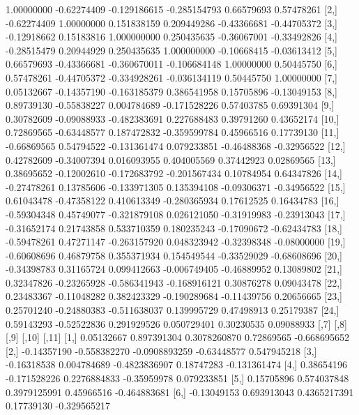\documentclass[a4paper, 12pt]{article}
\begin{document}
\begin{table}[H]
\small
\begin{Schunk}
\begin{Soutput}
             [,1]        [,2]         [,3]         [,4]        [,5]        [,6]
 [1,]  1.00000000 -0.62274409 -0.129186615 -0.285154793  0.66579693  0.57478261
 [2,] -0.62274409  1.00000000  0.151838159  0.209449286 -0.43366681 -0.44705372
 [3,] -0.12918662  0.15183816  1.000000000  0.250435635 -0.36067001 -0.33492826
 [4,] -0.28515479  0.20944929  0.250435635  1.000000000 -0.10668415 -0.03613412
 [5,]  0.66579693 -0.43366681 -0.360670011 -0.106684148  1.00000000  0.50445750
 [6,]  0.57478261 -0.44705372 -0.334928261 -0.036134119  0.50445750  1.00000000
 [7,]  0.05132667 -0.14357190 -0.163185379  0.386541958  0.15705896 -0.13049153
 [8,]  0.89739130 -0.55838227  0.004784689 -0.171528226  0.57403785  0.69391304
 [9,]  0.30782609 -0.09088933 -0.482383691  0.227688483  0.39791260  0.43652174
[10,]  0.72869565 -0.63448577  0.187472832 -0.359599784  0.45966516  0.17739130
[11,] -0.66869565  0.54794522 -0.131361474  0.079233851 -0.46488368 -0.32956522
[12,]  0.42782609 -0.34007394  0.016093955  0.404005569  0.37442923  0.02869565
[13,]  0.38695652 -0.12002610 -0.172683792 -0.201567434  0.10784954  0.64347826
[14,] -0.27478261  0.13785606 -0.133971305  0.135394108 -0.09306371 -0.34956522
[15,]  0.61043478 -0.47358122  0.410613349 -0.280365934  0.17612525  0.16434783
[16,] -0.59304348  0.45749077 -0.321879108  0.026121050 -0.31919983 -0.23913043
[17,] -0.31652174  0.21743858  0.533710359  0.180235243 -0.17090672 -0.62434783
[18,] -0.59478261  0.47271147 -0.263157920  0.048323942 -0.32398348 -0.08000000
[19,] -0.60608696  0.46879758  0.355371934  0.154549544 -0.33529029 -0.68608696
[20,] -0.34398783  0.31165724  0.099412663 -0.006749405 -0.46889952  0.13089802
[21,]  0.32347826 -0.23265928 -0.586341943 -0.168916121  0.30876278  0.09043478
[22,]  0.23483367 -0.11048282  0.382423329 -0.190289684 -0.11439756  0.20656665
[23,]  0.25701240 -0.24880383 -0.511638037  0.139995729  0.47498913  0.25179387
[24,]  0.59143293 -0.52522836  0.291929526  0.050729401  0.30230535  0.09088933
             [,7]         [,8]          [,9]       [,10]        [,11]
 [1,]  0.05132667  0.897391304  0.3078260870  0.72869565 -0.668695652
 [2,] -0.14357190 -0.558382270 -0.0908893259 -0.63448577  0.547945218
 [3,] -0.16318538  0.004784689 -0.4823836907  0.18747283 -0.131361474
 [4,]  0.38654196 -0.171528226  0.2276884833 -0.35959978  0.079233851
 [5,]  0.15705896  0.574037848  0.3979125991  0.45966516 -0.464883681
 [6,] -0.13049153  0.693913043  0.4365217391  0.17739130 -0.329565217

\end{Soutput}
\end{Schunk}
\end{table}
\end{document}
